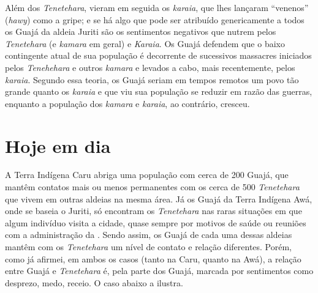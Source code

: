 Além dos \emph{Tenetehara}, vieram em seguida os \emph{karaia}, que lhes
lançaram ``venenos'' (\emph{hawy}) como a gripe; e se há algo que pode ser
atribuído genericamente a todos os Guajá da aldeia Juriti são os
sentimentos negativos que nutrem pelos \emph{Tenetehara} (e
\emph{kamara} em geral) e \emph{Karaia}. Os Guajá defendem que o baixo
contingente atual de sua população é decorrente de sucessivos massacres
iniciados pelos \emph{Tenehehara} e outros \emph{kamara} e levados a
cabo, mais recentemente, pelos \emph{karaia}. Segundo essa teoria, os
Guajá seriam em tempos remotos um povo tão grande quanto os
\emph{karaia} e que viu sua população se reduzir em razão das guerras,
enquanto a população dos \emph{kamara} e \emph{karaia}, ao contrário,
cresceu.

\section{Hoje em dia}

A Terra Indígena Caru abriga uma população com cerca de 200 Guajá, que
mantêm contatos mais ou menos permanentes com os cerca de 500
\emph{Tenetehara} que vivem em outras aldeias na mesma área. Já os Guajá
da Terra Indígena Awá, onde se baseia o  Juriti, só encontram os
\emph{Tenetehara} nas raras situações em que algum indivíduo visita a
cidade, quase sempre por motivos de saúde ou reuniões com a
administração da . Sendo assim, os Guajá de cada uma dessas aldeias
mantêm com os \emph{Tenetehara} um nível de contato e relação
diferentes. Porém, como já afirmei, em ambos os casos (tanto na  Caru,
quanto na  Awá), a relação entre Guajá e \emph{Tenetehara} é, pela
parte dos Guajá, marcada por sentimentos como desprezo, medo, receio. O
caso abaixo a ilustra.

